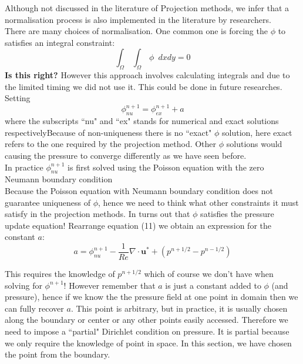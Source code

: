 Although not discussed in the literature of Projection methods, we infer that a normalisation process is also implemented in the literature by researchers.\\

There are many choices of normalisation. One common one is forcing the $\phi$ to satisfies an integral constraint:
\begin{equation}
\int_{\Omega}\,\int_{\Omega}\,\phi \,\,\, dx dy = 0
\end{equation}
\textbf{Is this right?}
However this approach involves calculating integrals and due to the limited timing we did not use it. This could be done in future researches.\\

Setting 
\begin{equation}
\phi^{n+1}_{nu} = \phi^{n+1}_{ex} + a
\end{equation}
where the subscripts ``nu" and ``ex" stands for numerical and exact solutions respectivelyBecause of non-uniqueness there is no ``exact" $\phi$ solution, here exact refers to the one required by the projection method. Other $\phi$ solutions would causing the pressure to converge differently as we have seen before.\\

In practice $\phi^{n+1}_{nu}$ is first solved using the Poisson equation with the zero Neumann boundary condition\\

Because the Poisson equation with Neumann boundary condition does not guarantee uniqueness of $\phi$, hence we need to think what other constraints it must satisfy in the projection methods. In turns out that $\phi$ satisfies the pressure update equation! Rearrange equation (11) we obtain an expression for the constant $a$:
\begin{equation}
a = \phi^{n+1}_{nu} - \dfrac{1}{Re} \nabla \cdot \textbf{u}^* + (p^{n+1/2} - p^{n-1/2})
\end{equation}

This requires the knowledge of $p^{n+1/2}$ which of course we don't have when solving for $\phi^{n+1}$! However remember that $a$ is just a constant added to $\phi$ (and pressure), hence if we know the the pressure field at one point in domain then we can fully recover $a$. This point is arbitrary, but in practice, it is usually chosen along the boundary or center or any other points easily accessed. Therefore we need to impose a ``partial" Dirichlet condition on pressure. It is partial because we only require the knowledge of point in space. In this section, we have chosen the point from the boundary.

